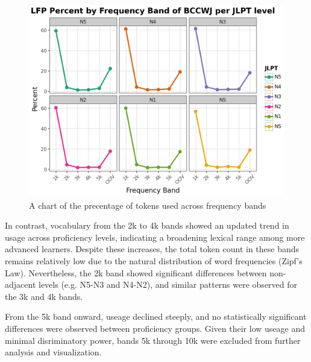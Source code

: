 \begin{figure}[htbp]
    \centering
    \includegraphics[scale=.4]{img/LFP/percentBands}
    \caption[A chart of the distribution of the average percent of tokens used across frequency band]{A chart of the precentage of tokens used across frequency bands}
    \label{fig:percentBands}
\end{figure}

In contrast, vocabulary from the 2k to 4k bands showed an updated trend in usage across proficiency levels,
indicating a broadening lexical range among more advanced learners. Despite these increases, the total token count
in these bands remains relatively low due to the natural distribution of word frequencies (Zipf's Law).
Nevertheless, the 2k band showed significant differences between non-adjacent levels (e.g. N5-N3 and N4-N2), and
similar patterns were observed for the 3k and 4k bands.

From the 5k band onward, useage declined steeply, and no statistically
significant differences were observed between proficiency groups. Given their low useage and minimal disriminatory
power, bands
5k through 10k were excluded from further analysis and visualization.


